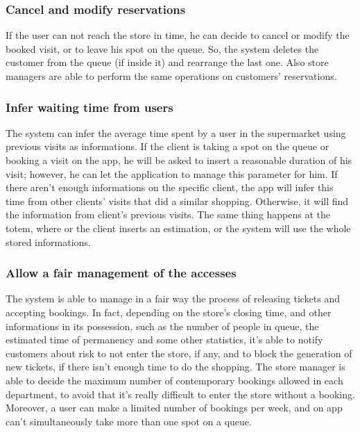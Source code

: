 \documentclass{article}
\begin{document}
		\subsubsection{Cancel and modify reservations}
		
		If the user can not reach the store in time, he can decide to cancel or modify the booked visit, or to leave his spot on the queue. So, the system deletes the customer from the queue (if inside it) and rearrange the last one. Also store managers are able to perform the same operations on customers' reservations. 
		
		
		\subsubsection{Infer waiting time from users}
		
		The system can infer the average time spent by a user in the supermarket using previous visits as informations. If the client is taking a spot on the queue or booking a visit on the app, he will be asked to insert a reasonable duration of his visit; however, he can let the application to manage this parameter for him. If there aren't enough informations on the specific client, the app will infer this time from other clients' visits that did a similar shopping. Otherwise, it will find the information from client's previous visits. The same thing happens at the totem, where or the client inserts an estimation, or the system will use the whole stored informations.
		
		\subsubsection{Allow a fair management of the accesses}
		The system is able to manage in a fair way the process of releasing tickets and accepting bookings. In fact, depending on the store's closing time, and other informations in its possession, such as the number of people in queue, the estimated time of permanency and some other statistics, it's able to notify customers about risk to not enter the store, if any, and to block the generation of new tickets, if there isn't enough time to do the shopping. The store manager is able to decide the maximum number of contemporary bookings allowed in each department, to avoid that it's really difficult to enter the store without a booking. Moreover, a user can make a limited number of bookings per week, and on app can't simultaneously take more than one spot on a queue. \\
\end{document}
